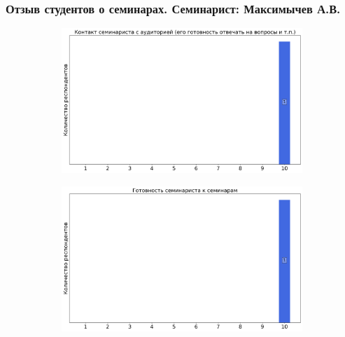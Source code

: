 	\subsubsection{Отзыв студентов о семинарах. Семинарист: Максимычев А.В.}
		\begin{figure}[H]
			\centering
			\begin{subfigure}[b]{0.45\textwidth}
				\centering
				\includegraphics[width=\textwidth]{images/2 course/Общая физика - электричество и магнетизм/seminarists-marks-Максимычев А.В.-0.png}
			\end{subfigure}
			\begin{subfigure}[b]{0.45\textwidth}
				\centering
				\includegraphics[width=\textwidth]{images/2 course/Общая физика - электричество и магнетизм/seminarists-marks-Максимычев А.В.-1.png}
			\end{subfigure}
			\begin{subfigure}[b]{0.45\textwidth}
				\centering

\end{subfigure}
\end{figure}
